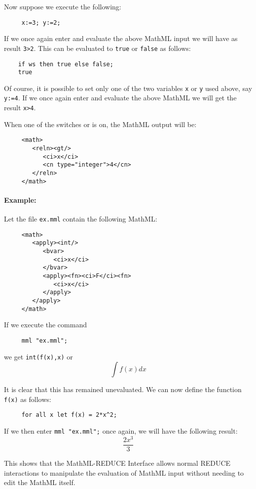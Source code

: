 Now suppose we execute the following:
\begin{verbatim}
     x:=3; y:=2;
\end{verbatim}

If we once again enter and evaluate the above MathML input we will
have as result \verb|3>2|.  This can be evaluated to \texttt{true}
or \texttt{false} as follows:
\begin{verbatim}
    if ws then true else false;
    true
\end{verbatim}

Of course, it is possible to set only one of the two variables
\texttt{x} or \texttt{y} used above, say \texttt{y:=4}.  If we once
again enter and evaluate the above MathML we will get the result
\verb|x>4|.

When one of the switches  or  is on, the MathML
output will be:
\begin{verbatim}
     <math>
        <reln><gt/>
           <ci>x</ci>
           <cn type="integer">4</cn>
        </reln>
     </math>
\end{verbatim}

\paragraph{Example:}
Let the file \texttt{ex.mml} contain the following MathML:
\begin{verbatim}
     <math>
        <apply><int/>
           <bvar>
              <ci>x</ci>
           </bvar>
           <apply><fn><ci>F</ci><fn>
              <ci>x</ci>
           </apply>
        </apply>
     </math>
\end{verbatim}
If we execute the command
\begin{verbatim}
     mml "ex.mml";
\end{verbatim}

we get \texttt{int(f(x),x)} or
\[ \int f(x) dx \]

It is clear that this has remained unevaluated.  We can now define the
function \texttt{f(x)} as follows:
\begin{verbatim}
     for all x let f(x) = 2*x^2;
\end{verbatim}
If we then enter \texttt{mml "ex.mml";} once again, we will have the
following result:
\[ \frac {2x^3}{3} \]

This shows that the MathML-REDUCE Interface allows normal REDUCE
interactions to manipulate the evaluation of MathML input without
needing to edit the MathML itself.

